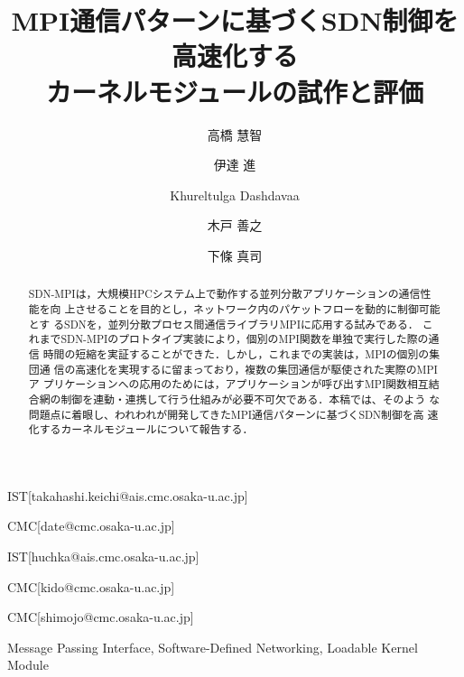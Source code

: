 \documentclass[submit,techrep,noauthor]{ipsj}
\begin{document}
\title{MPI通信パターンに基づくSDN制御を高速化する\\
    カーネルモジュールの試作と評価}



\author{高橋 慧智}{}{IST}[takahashi.keichi@ais.cmc.osaka-u.ac.jp]
\author{伊達 進}{}{CMC}[date@cmc.osaka-u.ac.jp]
\author{Khureltulga Dashdavaa}{}{IST}[huchka@ais.cmc.osaka-u.ac.jp]
\author{木戸 善之}{}{CMC}[kido@cmc.osaka-u.ac.jp]
\author{下條 真司}{}{CMC}[shimojo@cmc.osaka-u.ac.jp]

\begin{abstract}
SDN-MPIは，大規模HPCシステム上で動作する並列分散アプリケーションの通信性能を向
上させることを目的とし，ネットワーク内のパケットフローを動的に制御可能とす
るSDNを，並列分散プロセス間通信ライブラリMPIに応用する試みである．
これまでSDN-MPIのプロトタイプ実装により，個別のMPI関数を単独で実行した際の通信
時間の短縮を実証することができた．しかし，これまでの実装は，MPIの個別の集団通
信の高速化を実現するに留まっており，複数の集団通信が駆使された実際のMPIア
プリケーションへの応用のためには，アプリケーションが呼び出すMPI関数相互結
合網の制御を連動・連携して行う仕組みが必要不可欠である．本稿では、そのよう
な問題点に着眼し、われわれが開発してきたMPI通信パターンに基づくSDN制御を高
速化するカーネルモジュールについて報告する．
\end{abstract}

\begin{jkeyword}
Message Passing Interface, Software-Defined Networking, Loadable Kernel Module
\end{jkeyword}

\maketitle








\end{document}
